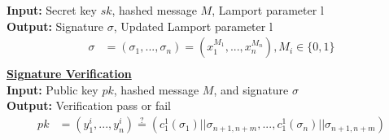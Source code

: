 \documentclass[]{scrartcl}
\makeatletter
\newcommand{\mathcenter}{\@fleqnfalse}
\makeatother
\begin{document}
\textbf{Input:} Secret key $sk$, hashed message $M$, Lamport parameter l \\
\textbf{Output:} Signature $\sigma$, Updated Lamport parameter l
\mathcenter
\begin{equation}
\begin{split}
\sigma & = (\sigma_1,...,\sigma_n)= (x^{M_1}_1, ..., x^{M_n}_n), M_i \in \{0,1\} \\
\end{split}
\end{equation}
\textbf{\underline{Signature Verification}}\\
\textbf{Input:} Public key $pk$, hashed message $M$, and signature $\sigma$\\
\textbf{Output:} Verification pass or fail
\mathcenter
\begin{equation}
\begin{split}
pk & = (y^i_1,...,y^i_n) \stackrel{?}{=}(c^1_1(\sigma_{1})||\sigma_{n+1,n+m},...,c^1_1(\sigma_{n})||\sigma_{n+1,n+m})
\end{split}
\end{equation}
\end{document}
